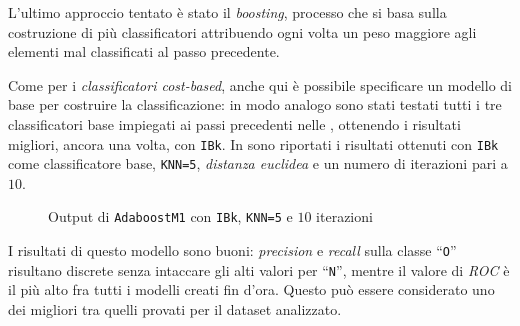 L'ultimo approccio tentato è stato il \emph{boosting}, processo che si basa sulla costruzione di più classificatori attribuendo ogni volta un peso maggiore agli elementi mal classificati al passo precedente.

Come per i \emph{classificatori cost-based}, anche qui è possibile specificare un modello di base per costruire la classificazione:
in modo analogo sono stati testati tutti i tre classificatori base impiegati ai passi precedenti nelle ,
ottenendo i risultati migliori, ancora una volta, con \texttt{IBk}.
In  sono riportati i risultati ottenuti con \texttt{IBk} come classificatore base, \texttt{KNN=5}, \emph{distanza euclidea} e un numero di iterazioni pari a \(10\).

\begin{figure}[H]
  \centering
  \caption{Output di \texttt{AdaboostM1} con \texttt{IBk}, \texttt{KNN=5} e \(10\) iterazioni}%
  \label{fig:adaboost:ibk5}
\end{figure}

I risultati di questo modello sono buoni: \emph{precision} e \emph{recall} sulla classe ``\texttt{O}'' risultano discrete senza intaccare gli alti valori per ``\texttt{N}'',
mentre il valore di \emph{ROC} è il più alto fra tutti i modelli creati fin d'ora. Questo può essere considerato uno dei migliori tra quelli provati per il dataset analizzato.
